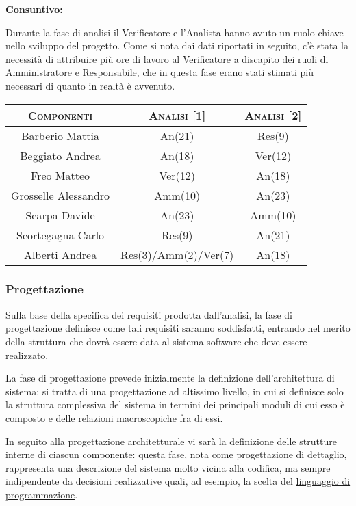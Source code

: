 \documentclass[11pt,a4paper]{article}
\begin{document}
\bigskip \bigskip
\begin{large}\textbf{Consuntivo:}\end{large}
\newline
Durante la fase di analisi il Verificatore e l'Analista hanno avuto un ruolo chiave nello sviluppo del progetto.
Come si nota dai dati riportati in seguito, c'è stata la necessità di attribuire più ore di lavoro al Verificatore a discapito dei ruoli di Amministratore e Responsabile, che in questa fase erano stati stimati più necessari di quanto in realtà è avvenuto.
\\
\begin{center}
\begin{tabular}{|c||c|c|}
\hline
\textsc{Componenti} & \textsc{Analisi [1]} & \textsc{Analisi [2]} \\ \hline \hline
Barberio Mattia & An(21) & Res(9) \\ \hline
Beggiato Andrea & An(18) & Ver(12) \\ \hline
Freo Matteo & Ver(12) & An(18) \\ \hline
Grosselle Alessandro & Amm(10) & An(23) \\ \hline
Scarpa Davide & An(23) & Amm(10) \\ \hline
Scortegagna Carlo & Res(9) & An(21) \\ \hline
Alberti Andrea & Res(3)/Amm(2)/Ver(7) & An(18) \\ \hline
\end{tabular}
\end{center}
\bigskip
\subsubsection{Progettazione}
Sulla base della specifica dei requisiti prodotta dall'analisi, la fase di progettazione definisce come tali requisiti saranno soddisfatti, entrando nel merito della struttura che dovrà essere data al sistema software che deve essere realizzato.

La fase di progettazione prevede inizialmente la definizione dell'architettura di sistema: si tratta di una progettazione ad altissimo livello, in cui si definisce solo la struttura complessiva del sistema in termini dei principali moduli di cui esso è composto e delle relazioni macroscopiche fra di essi.

In seguito alla progettazione architetturale vi sarà la definizione delle strutture interne di ciascun componente: questa fase, nota come progettazione di dettaglio, rappresenta una descrizione del sistema molto vicina alla codifica, ma sempre indipendente da decisioni realizzative quali, ad esempio, la scelta del \underline{linguaggio di programmazione}.
\end{document}
